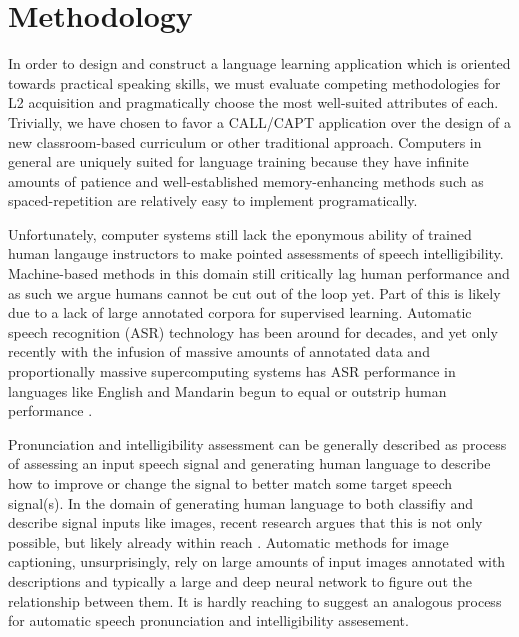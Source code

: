 \section{Methodology} 
In order to design and construct a language learning application which is oriented towards practical speaking skills, we must evaluate competing methodologies for L2 acquisition and pragmatically choose the most well-suited attributes of each. Trivially, we have chosen to favor a CALL/CAPT application over the design of a new classroom-based curriculum or other traditional approach. Computers in general are uniquely suited for language training because they have infinite amounts of patience and well-established memory-enhancing methods such as spaced-repetition \cite{glanzer1971repetition} \cite{wozniak2007supermemo} \cite{wozniak1990supermemo} \cite{cuddy1982forgetting} are relatively easy to implement programatically. 

Unfortunately, computer systems still lack the eponymous ability of trained human langauge instructors to make pointed assessments of speech intelligibility. Machine-based methods in this domain still critically lag human performance and as such we argue humans cannot be cut out of the loop yet. Part of this is likely due to a lack of large annotated corpora for supervised learning. Automatic speech recognition (ASR) technology has been around for decades, and yet only recently with the infusion of massive amounts of annotated data and proportionally massive supercomputing systems has ASR performance in languages like English and Mandarin begun to equal or outstrip human performance \cite{hannun2014deep} \cite{hinton2012deep} \cite{chan2016listen}. 

Pronunciation and intelligibility assessment can be generally described as process of assessing an input speech signal and generating human language to describe how to improve or change the signal to better match some target speech signal(s). In the domain of generating human language to both classifiy and describe signal inputs like images, recent research argues that this is not only possible, but likely already within reach \cite{reed2016learning} \cite{tran2016rich}. Automatic methods for image captioning, unsurprisingly, rely on large amounts of input images annotated with descriptions and typically a large and deep neural network to figure out the relationship between them. It is hardly reaching to suggest an analogous process for automatic speech pronunciation and intelligibility assesement. 

